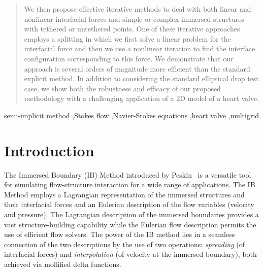 \documentclass[preprint,12pt]{elsarticle}
\begin{document}
\begin{frontmatter}
\begin{abstract}
We then propose effective iterative methods to deal with both linear and nonlinear interfacial forces and simple or complex immersed structures with tethered or untethered points.  One of these iterative approaches employs a splitting in which 
we first solve a linear problem  for the interfacial force and then we use a nonlinear iteration to find the interface configuration corresponding to this force.  We demonstrate that our approach is several orders of magnitude more efficient than the standard explicit method. In addition to considering the standard elliptical drop test case, we show both the robustness and efficacy of our proposed methodology with a challenging application of a 2D model of a heart valve.
\end{abstract}

\begin{keyword}
semi-implicit method \sep Stokes flow \sep Navier-Stokes equations \sep heart valve \sep multigrid


\end{keyword}

\end{frontmatter}

\section{Introduction}
The Immersed Boundary (IB) Method introduced by Peskin~\cite{Peskin77} is a versatile tool for simulating flow-structure interaction for a wide range of applications.  The IB Method employs a Lagrangian representation of 
the immersed structures and their interfacial forces and an Eulerian description of the 
flow variables (velocity and pressure).  The Lagrangian description of the immersed boundaries provides a vast structure-building capability while the Eulerian flow description permits the use of efficient flow solvers.
The power of the IB method lies in a seamless connection of the two descriptions by the use of two operations: 
{\em spreading} (of interfacial forces) and {\em interpolation} (of velocity at the immersed boundary), both achieved via mollified delta functions. 
  
\end{document}
